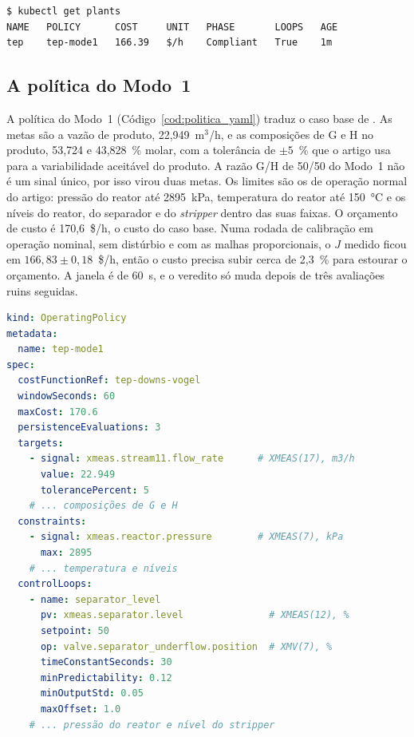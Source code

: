 \noindent\begin{minipage}{\linewidth}
\begin{lstlisting}[language=bash, caption={O veredito visto pelo \texttt{kubectl}}, label={cod:kubectl}]
$ kubectl get plants
NAME   POLICY      COST     UNIT   PHASE       LOOPS   AGE
tep    tep-mode1   166.39   $/h    Compliant   True    1m
\end{lstlisting}
\end{minipage}

\subsection{A política do Modo~1}
\label{subsec:politica_modo1}

A política do Modo~1 (Código~\ref{cod:politica_yaml}) traduz o caso base de . As metas são a vazão de produto, 22,949~m$^3$/h, e as composições de G e H no produto, 53,724 e 43,828~\% molar, com a tolerância de $\pm 5$~\% que o artigo usa para a variabilidade aceitável do produto. A razão G/H de 50/50 do Modo~1 não é um sinal único, por isso virou duas metas. Os limites são os de operação normal do artigo: pressão do reator até 2895~kPa, temperatura do reator até 150~°C e os níveis do reator, do separador e do \textit{stripper} dentro das suas faixas. O orçamento de custo é 170,6~\$/h, o custo do caso base. Numa rodada de calibração em operação nominal, sem distúrbio e com as malhas proporcionais, o $J$ medido ficou em $166{,}83 \pm 0{,}18$~\$/h, então o custo precisa subir cerca de 2,3~\% para estourar o orçamento. A janela é de 60~s, e o veredito só muda depois de três avaliações ruins seguidas.

\noindent\begin{minipage}{\linewidth}
\begin{lstlisting}[language=yaml, caption={Trechos do manifesto da política do Modo~1}, label={cod:politica_yaml}]
kind: OperatingPolicy
metadata:
  name: tep-mode1
spec:
  costFunctionRef: tep-downs-vogel
  windowSeconds: 60
  maxCost: 170.6
  persistenceEvaluations: 3
  targets:
    - signal: xmeas.stream11.flow_rate      # XMEAS(17), m3/h
      value: 22.949
      tolerancePercent: 5
    # ... composições de G e H
  constraints:
    - signal: xmeas.reactor.pressure        # XMEAS(7), kPa
      max: 2895
    # ... temperatura e níveis
  controlLoops:
    - name: separator_level
      pv: xmeas.separator.level               # XMEAS(12), %
      setpoint: 50
      op: valve.separator_underflow.position  # XMV(7), %
      timeConstantSeconds: 30
      minPredictability: 0.12
      minOutputStd: 0.05
      maxOffset: 1.0
    # ... pressão do reator e nível do stripper
\end{lstlisting}
\end{minipage}

